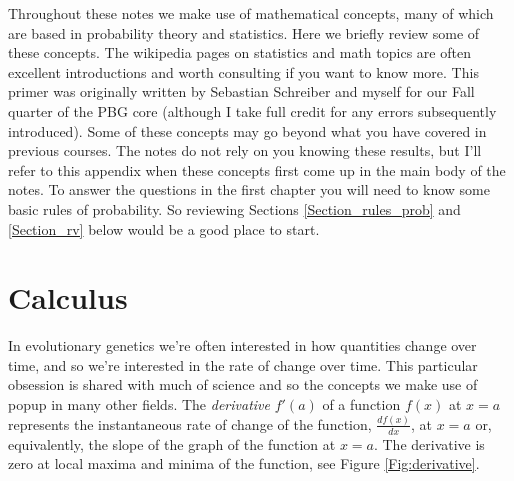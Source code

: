 Throughout these notes we make use of mathematical concepts, many of
which are based in probability theory and statistics. Here we briefly
review some of these concepts. The wikipedia pages on
statistics and math topics are often excellent introductions and
worth consulting if you want to know more. This primer was originally written by
Sebastian Schreiber and myself for our Fall quarter of the PBG core
(although I take full credit for any errors subsequently introduced).
Some of these concepts may go beyond what you have covered in previous
courses. The notes do not rely on you knowing these results, but I'll refer to this appendix when these concepts first come
up in the main body of the notes. To answer the questions in the first
chapter you will need to know some basic rules of probability. So
reviewing Sections \ref{Section_rules_prob} and \ref{Section_rv} below
would be  a good place to start.



\section{Calculus}
In evolutionary genetics we're often interested in how quantities
change over time, and so we're interested in the rate of change over
time. This particular obsession is shared with much of
science and so the concepts we make use of popup in many other fields. 
The \emph{derivative} $f'(a)$ of a function $f(x)$ at $x=a$ represents
the instantaneous rate of change of the function, $\frac{df(x)}{dx}$, at $x=a$ or,
equivalently, the slope of the graph of the function at $x=a$. The
derivative is zero at local maxima and minima of the function, see Figure \ref{Fig:derivative}.
    
